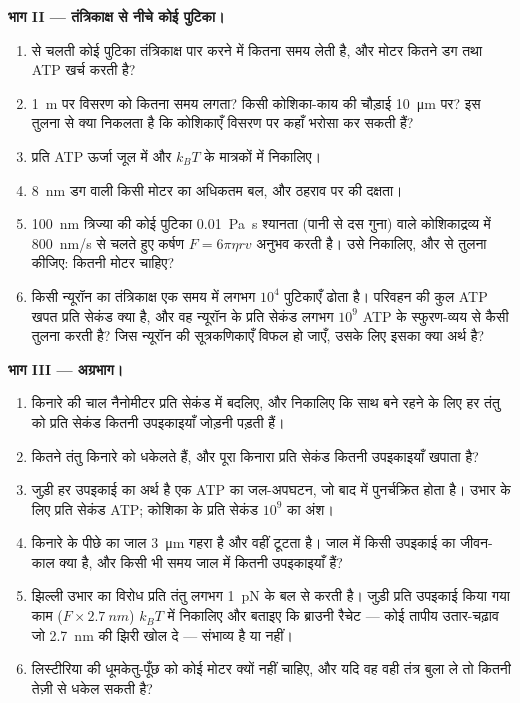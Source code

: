 \begin{problem}
\medskip
\noindent\textbf{भाग II --- तंत्रिकाक्ष से नीचे कोई पुटिका।}
\begin{enumerate}[resume]
  \item {} से चलती कोई पुटिका तंत्रिकाक्ष पार करने में कितना समय
        लेती है, और मोटर कितने डग तथा ATP खर्च करती है?
  \item \qty{1}{m} पर विसरण को कितना समय लगता? किसी कोशिका-काय की
        चौड़ाई \qty{10}{\micro m} पर? इस तुलना से क्या निकलता है कि
        कोशिकाएँ विसरण पर कहाँ भरोसा कर सकती हैं?
  \item प्रति ATP ऊर्जा जूल में और $k_{B}T$ के मात्रकों में निकालिए।
  \item \qty{8}{nm} डग वाली किसी मोटर का अधिकतम बल, और ठहराव पर
         की दक्षता।
  \item \qty{100}{nm} त्रिज्या की कोई पुटिका
        \qty{0.01}{Pa.s} श्यानता (पानी से दस गुना) वाले कोशिकाद्रव्य
        में \qty{800}{nm/s} से चलते हुए कर्षण $F = 6\pi\eta r v$ अनुभव
        करती है। उसे निकालिए, और  से तुलना कीजिए: कितनी मोटर चाहिए?
  \item किसी न्यूरॉन का तंत्रिकाक्ष एक समय में लगभग $10^{4}$ पुटिकाएँ
        ढोता है। परिवहन की कुल ATP खपत प्रति सेकंड क्या है, और वह
        न्यूरॉन के प्रति सेकंड लगभग $10^{9}$ ATP के स्फुरण-व्यय से कैसी
        तुलना करती है? जिस न्यूरॉन की सूत्रकणिकाएँ विफल हो जाएँ, उसके
        लिए इसका क्या अर्थ है?
\end{enumerate}

\medskip
\noindent\textbf{भाग III --- अग्रभाग।}
\begin{enumerate}[resume]
  \item किनारे की चाल नैनोमीटर प्रति सेकंड में बदलिए, और निकालिए कि
        साथ बने रहने के लिए हर तंतु को प्रति सेकंड कितनी उपइकाइयाँ
        जोड़नी पड़ती हैं।
  \item कितने तंतु किनारे को धकेलते हैं, और पूरा किनारा प्रति सेकंड
        कितनी उपइकाइयाँ खपाता है?
  \item जुड़ी हर उपइकाई का अर्थ है एक ATP का जल-अपघटन, जो बाद में
        पुनर्चक्रित होता है। उभार के लिए प्रति सेकंड ATP; कोशिका के
        प्रति सेकंड $10^{9}$ का अंश।
  \item किनारे के पीछे का जाल \qty{3}{\micro m} गहरा है और वहीं टूटता
        है। जाल में किसी उपइकाई का जीवन-काल क्या है, और किसी भी समय
        जाल में कितनी उपइकाइयाँ हैं?
  \item झिल्ली उभार का विरोध प्रति तंतु लगभग \qty{1}{pN} के बल से
        करती है। जुड़ी प्रति उपइकाई किया गया काम
        ($F\times \qty{2.7}{nm}$) $k_{B}T$ में निकालिए और बताइए कि
        ब्राउनी रैचेट --- कोई तापीय उतार-चढ़ाव जो \qty{2.7}{nm} की झिरी
        खोल दे --- संभाव्य है या नहीं।
  \item लिस्टीरिया की धूमकेतु-पूँछ को कोई मोटर क्यों नहीं चाहिए, और यदि
        वह वही तंत्र बुला ले तो कितनी तेज़ी से धकेल सकती है?
\end{enumerate}


\end{problem}
